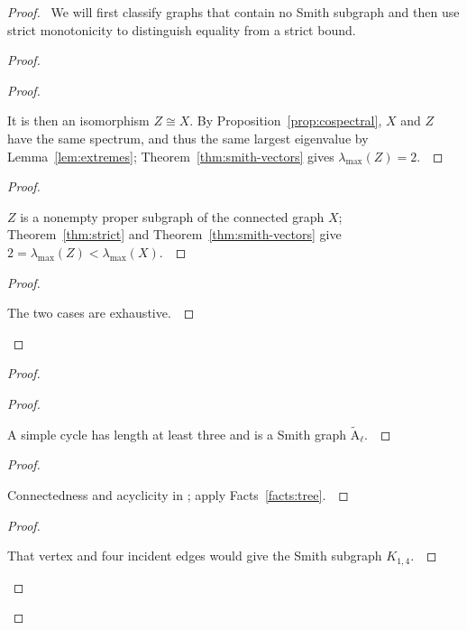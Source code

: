 \documentclass[11pt]{amsart}
\let\qed\relax
\theoremstyle{definition}
\begin{document}
\begin{proof}
\pfsketch\ We will first classify graphs that contain no Smith subgraph and then use strict monotonicity to distinguish equality from a strict bound.
\begin{proof}
\begin{proof}
\pf\ \raggedright It is then an isomorphism $Z\cong X$. By Proposition~\ref{prop:cospectral}, $X$ and $Z$ have the same spectrum, and thus the same largest eigenvalue by Lemma~\ref{lem:extremes}; Theorem~\ref{thm:smith-vectors} gives $\lambda_{\max}(Z)=2$.~\qed
\end{proof}
\begin{proof}
\pf\ \raggedright $Z$ is a nonempty proper subgraph of the connected graph $X$; Theorem~\ref{thm:strict} and Theorem~\ref{thm:smith-vectors} give $2=\lambda_{\max}(Z)<\lambda_{\max}(X)$.~\qed
\end{proof}
\qedstep
\begin{proof}
\pf\ \raggedright The two cases are exhaustive.~\qed
\end{proof}
\end{proof}
\begin{proof}
\begin{proof}
\pf\ \raggedright A simple cycle has length at least three and is a Smith graph $\widetilde{\mathrm A}_{\ell}$.~\qed
\end{proof}
\begin{proof}
\pf\ \raggedright Connectedness and acyclicity in ; apply Facts~\ref{facts:tree}.~\qed
\end{proof}
\begin{proof}
\pf\ \raggedright That vertex and four incident edges would give the Smith subgraph $K_{1,4}$.~\qed
\end{proof}

\end{proof}
\end{proof}
\end{document}
